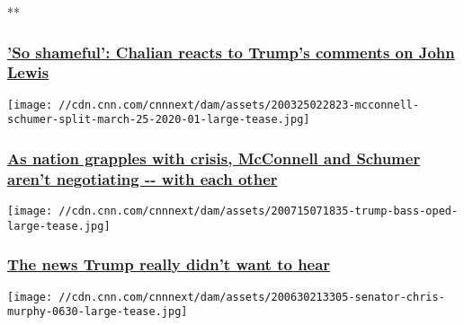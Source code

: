 **

\hypertarget{so-shameful-chalian-reacts-to-trumps-comments-on-john-lewis}{%
\subsubsection{\texorpdfstring{\href{/videos/politics/2020/08/04/donald-trump-john-lewis-axios-chalian-newday-vpx.cnn}{'So
shameful': Chalian reacts to Trump's comments on John
Lewis}}{'So shameful': Chalian reacts to Trump's comments on John Lewis}}\label{so-shameful-chalian-reacts-to-trumps-comments-on-john-lewis}}

\href{/2020/08/03/politics/chuck-schumer-mitch-mcconnell-stimulus-negotiations/index.html}{}

\texttt{[image: //cdn.cnn.com/cnnnext/dam/assets/200325022823-mcconnell-schumer-split-march-25-2020-01-large-tease.jpg]}

\hypertarget{as-nation-grapples-with-crisis-mcconnell-and-schumer-arent-negotiating----with-each-other}{%
\subsubsection{\texorpdfstring{\href{/2020/08/03/politics/chuck-schumer-mitch-mcconnell-stimulus-negotiations/index.html}{As
nation grapples with crisis, McConnell and Schumer aren't negotiating
-\/- with each
other}}{As nation grapples with crisis, McConnell and Schumer aren't negotiating -\/- with each other}}\label{as-nation-grapples-with-crisis-mcconnell-and-schumer-arent-negotiating----with-each-other}}

\href{/2020/08/03/opinions/manhattan-da-subpeona-bad-news-trump-honig/index.html}{}

\texttt{[image: //cdn.cnn.com/cnnnext/dam/assets/200715071835-trump-bass-oped-large-tease.jpg]}

\hypertarget{the-news-trump-really-didnt-want-to-hear}{%
\subsubsection{\texorpdfstring{\href{/2020/08/03/opinions/manhattan-da-subpeona-bad-news-trump-honig/index.html}{The
news Trump really didn't want to
hear}}{The news Trump really didn't want to hear}}\label{the-news-trump-really-didnt-want-to-hear}}

\href{/2020/08/03/politics/foreign-election-interference-senate/index.html}{}

\texttt{[image: //cdn.cnn.com/cnnnext/dam/assets/200630213305-senator-chris-murphy-0630-large-tease.jpg]}

